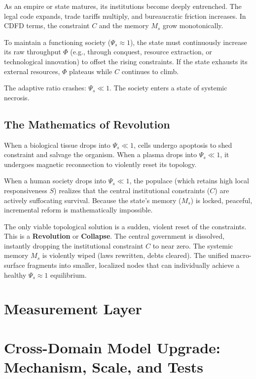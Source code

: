 \documentclass[11pt,a4paper]{article}
\begin{document}
As an empire or state matures, its institutions become deeply entrenched. The legal code expands, trade tariffs multiply, and bureaucratic friction increases. In CDFD terms, the constraint $C$ and the memory $M_s$ grow monotonically.

To maintain a functioning society ($\Psi_s \approx 1$), the state must continuously increase its raw throughput $\Phi$ (e.g., through conquest, resource extraction, or technological innovation) to offset the rising constraints. If the state exhausts its external resources, $\Phi$ plateaus while $C$ continues to climb.

The adaptive ratio crashes: $\Psi_s \ll 1$. The society enters a state of systemic necrosis.

\subsection{The Mathematics of Revolution}
When a biological tissue drops into $\Psi_s \ll 1$, cells undergo apoptosis to shed constraint and salvage the organism. When a plasma drops into $\Psi_s \ll 1$, it undergoes magnetic reconnection to violently reset its topology.

When a human society drops into $\Psi_s \ll 1$, the populace (which retains high local responsiveness $S$) realizes that the central institutional constraints ($C$) are actively suffocating survival. Because the state's memory ($M_s$) is locked, peaceful, incremental reform is mathematically impossible.

The only viable topological solution is a sudden, violent reset of the constraints. This is a \textbf{Revolution} or \textbf{Collapse}. The central government is dissolved, instantly dropping the institutional constraint $C$ to near zero. The systemic memory $M_s$ is violently wiped (laws rewritten, debts cleared). The unified macro-surface fragments into smaller, localized nodes that can individually achieve a healthy $\Psi_s \approx 1$ equilibrium.



\section{Measurement Layer}

\section{Cross-Domain Model Upgrade: Mechanism, Scale, and Tests}
\end{document}
